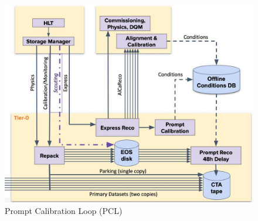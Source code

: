 




\begin{figure}[h!]	
\centering
\includegraphics[width=\textwidth]{figures/PCL.jpg} %
\caption{Prompt Calibration Loop (PCL)}
\label{fig:PCL}
\end{figure}

























































